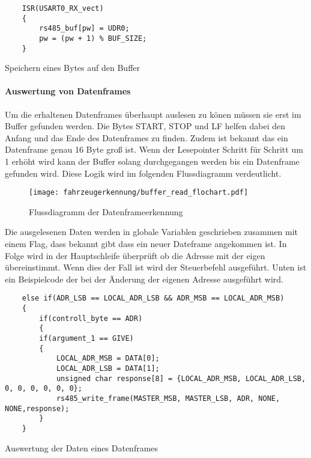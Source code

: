 \begin{listing}[H]
    \begin{verbatim}
    ISR(USART0_RX_vect)
    {
        rs485_buf[pw] = UDR0;
        pw = (pw + 1) % BUF_SIZE;
    }   
    \end{verbatim}
    \caption{Speichern eines Bytes auf den Buffer}
\end{listing}

\paragraph{Auswertung von Datenframes}\mbox{} 

Um die erhaltenen Datenframes überhaupt auslesen zu könen müssen sie erst im Buffer gefunden
werden. Die Bytes START, STOP und LF helfen dabei den Anfang und das Ende des Datenframes zu
finden. Zudem ist bekannt das ein Datenframe genau 16 Byte groß ist. Wenn der Lesepointer Schritt
für Schritt um 1 erhöht wird kann der Buffer solang durchgegangen werden bis ein Datenframe
gefunden wird. Diese Logik wird im folgenden Flussdiagramm verdeutlicht.

\begin{figure}[H]
    \centering
    \texttt{[image: fahrzeugerkennung/buffer\_read\_flochart.pdf]}
    \caption{Flussdiagramm der Datenframeerkennung}
\end{figure}

Die ausgelesenen Daten werden in globale Variablen geschrieben zusammen mit einem Flag,
dass bekannt gibt dass ein neuer Dateframe angekommen ist. In Folge wird in der Hauptschleife
überprüft ob die Adresse mit der eigen übereinstimmt. Wenn dies der Fall ist wird der Steuerbefehl
ausgeführt. Unten ist ein Beispielcode der bei der Änderung der eigenen Adresse ausgeführt wird.
\begin{listing}[H]
    \begin{verbatim}
    else if(ADR_LSB == LOCAL_ADR_LSB && ADR_MSB == LOCAL_ADR_MSB)
    {
        if(controll_byte == ADR)
        {
        if(argument_1 == GIVE)
        {
            LOCAL_ADR_MSB = DATA[0];
            LOCAL_ADR_LSB = DATA[1];
            unsigned char response[8] = {LOCAL_ADR_MSB, LOCAL_ADR_LSB, 0, 0, 0, 0, 0, 0};
            rs485_write_frame(MASTER_MSB, MASTER_LSB, ADR, NONE, NONE,response);
        }
    }  
    \end{verbatim}
    \caption{ Auswertung der Daten eines Datenframes}
\end{listing}



